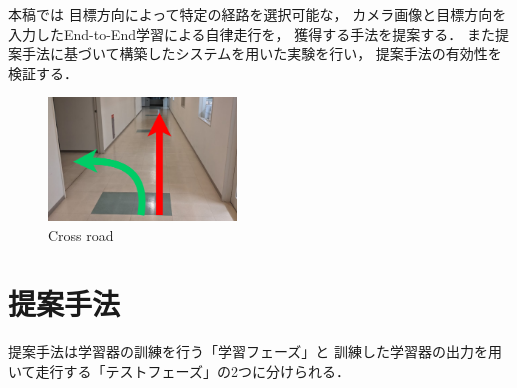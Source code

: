 \documentclass[10pt]{jarticle}
\begin{document}
    本稿では
    目標方向によって特定の経路を選択可能な，
    カメラ画像と目標方向を入力したEnd-to-End学習による自律走行を，
    獲得する手法を提案する．
    また提案手法に基づいて構築したシステムを用いた実験を行い，
    提案手法の有効性を検証する．
    \begin{center}
        \begin{figure}[h]
            \centering
            \includegraphics[width=5cm]{./fig/zyuzibunki.png}
            \caption{Cross road}
            \label{fig:bunki}
        \end{figure}
    \end{center}
    \section{提案手法}%
    提案手法は学習器の訓練を行う「学習フェーズ」と
    訓練した学習器の出力を用いて走行する「テストフェーズ」の2つに分けられる．
    
\end{document}
